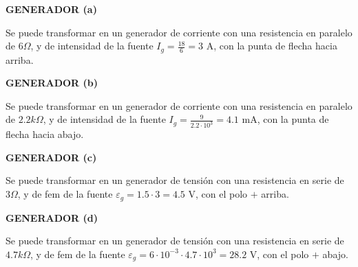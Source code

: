 \begin{example}
	    \textbf{GENERADOR (a)}
	    
	    Se puede transformar en un generador de corriente con una resistencia en paralelo de $6\Omega$, y de intensidad de la fuente $I_g=\frac{18}{6}=3$ A, con la punta de flecha hacia arriba.
	    
	    \textbf{GENERADOR (b)}
	    
	    Se puede transformar en un generador de corriente con una resistencia en paralelo de $2.2k\Omega$, y de intensidad de la fuente $I_g=\frac{9}{2.2\cdot10^3}=4.1$ mA, con la punta de flecha hacia abajo.
	    
	    \textbf{GENERADOR (c)}
	    
	    Se puede transformar en un generador de tensión con una resistencia en serie de $3\Omega$, y de fem de la fuente $\varepsilon_g=1.5\cdot 3=4.5$ V, con el polo $+$ arriba.
	    
	    \textbf{GENERADOR (d)}
	    
	    Se puede transformar en un generador de tensión con una resistencia en serie de $4.7k\Omega$, y de fem de la fuente $\varepsilon_g=6\cdot 10^{-3}\cdot 4.7\cdot 10^3=28.2$ V, con el polo $+$ abajo.
	\end{example}
	
